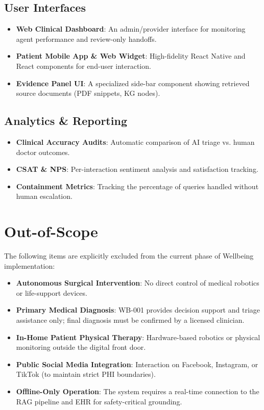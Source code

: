 \documentclass[12pt,a4paper]{article}
\begin{document}
\subsection{User Interfaces}
\begin{itemize}
    \item \textbf{Web Clinical Dashboard}: An admin/provider interface for monitoring agent performance and review-only handoffs.
    \item \textbf{Patient Mobile App & Web Widget}: High-fidelity React Native and React components for end-user interaction.
    \item \textbf{Evidence Panel UI}: A specialized side-bar component showing retrieved source documents (PDF snippets, KG nodes).
\end{itemize}

\subsection{Analytics \& Reporting}
\begin{itemize}
    \item \textbf{Clinical Accuracy Audits}: Automatic comparison of AI triage vs. human doctor outcomes.
    \item \textbf{CSAT & NPS}: Per-interaction sentiment analysis and satisfaction tracking.
    \item \textbf{Containment Metrics}: Tracking the percentage of queries handled without human escalation.
\end{itemize}

\section{Out-of-Scope}
The following items are explicitly excluded from the current phase of Wellbeing implementation:
\begin{itemize}
    \item \textbf{Autonomous Surgical Intervention}: No direct control of medical robotics or life-support devices.
    \item \textbf{Primary Medical Diagnosis}: WB-001 provides decision support and triage assistance only; final diagnosis must be confirmed by a licensed clinician.
    \item \textbf{In-Home Patient Physical Therapy}: Hardware-based robotics or physical monitoring outside the digital front door.
    \item \textbf{Public Social Media Integration}: Interaction on Facebook, Instagram, or TikTok (to maintain strict PHI boundaries).
    \item \textbf{Offline-Only Operation}: The system requires a real-time connection to the RAG pipeline and EHR for safety-critical grounding.
\end{itemize}
\end{document}
